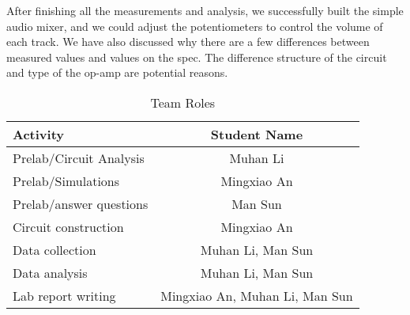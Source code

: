 \hfill \newline
\phantom{ } After finishing all the measurements and analysis, we successfully built the simple audio mixer, and we could adjust the potentiometers to control the volume of each track. We have also discussed why there are a few differences between measured values and values on the spec. The difference structure of the circuit and type of the op-amp are potential reasons.\\

\begin{table}[!htbp]
	\caption{Team Roles}
	\renewcommand\arraystretch{1.5}\centering
	\begin{tabular}{l|c}
		\hline
		\hline
		Activity					&	Student Name 	\\
		\hline
		Prelab/Circuit Analysis		& 	Muhan Li		\\
		\hline
		Prelab/Simulations			&	Mingxiao An		\\
		\hline
		Prelab/answer questions		&	Man Sun			\\
		\hline
		Circuit construction		&	Mingxiao An		\\
		\hline
		Data collection				& Muhan Li, Man Sun	\\
		\hline
		Data analysis				& Muhan Li, Man Sun \\
		\hline
		Lab report writing			& Mingxiao An, Muhan Li, Man Sun \\
		\hline
		\hline
	\end{tabular}\\
\end{table}